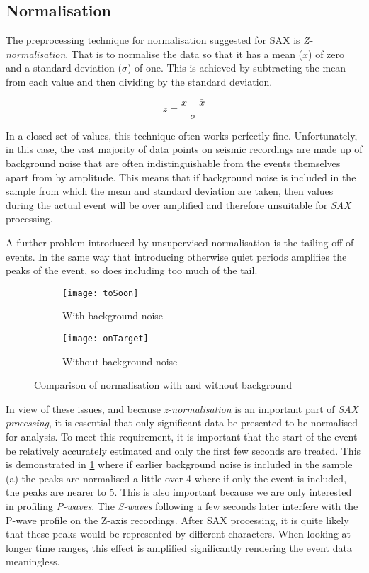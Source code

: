 \documentclass[../report.tex]{subfiles}
\begin{document}
	
\subsection{Normalisation} \label{sec:Z-normalisation}
	The preprocessing technique for normalisation suggested for SAX \citep{sax} is \textit{Z-normalisation}.  That is to normalise the data so that it has a mean ($\bar{x}$) of zero and a standard deviation ($\sigma$) of one.  This is achieved by subtracting the mean from each value and then dividing by the standard deviation.
	
	\begin{equation}
	z = \dfrac{x - \bar{x}}{\sigma}
	\end{equation}
	
	In a closed set of values, this technique often works perfectly fine.  Unfortunately, in this case, the vast majority of data points on seismic recordings are made up of background noise that are often indistinguishable from the events themselves apart from by amplitude.  This means that if background noise is included in the sample from which the mean and standard deviation are taken, then values during the actual event will be over amplified and therefore unsuitable for \textit{SAX} processing.
	
	A further problem introduced by unsupervised normalisation is the tailing off of events.  In the same way that introducing otherwise quiet periods amplifies the peaks of the event, so does including too much of the tail.
	
\begin{figure}[H]
	\begin{subfigure}{\textwidth}
		\centering
		\texttt{[image: toSoon]}
		\caption[]{With background noise}
	\end{subfigure}
	\begin{subfigure}{\textwidth}
		\centering
		\texttt{[image: onTarget]}
		\caption[]{Without background noise}
	\end{subfigure}
	\caption{Comparison of normalisation with and without background}
	\label{fig:tosoon}
\end{figure}

	In view of these issues, and because \textit{z-normalisation} is an important part of \textit{SAX processing}, it is essential that only significant data be presented to be normalised for analysis.  To meet this requirement, it is important that the start of the event be relatively accurately estimated and only the first few seconds are treated.  This is demonstrated in \cref{fig:tosoon} where if earlier background noise is included in the sample (a) the peaks are normalised a little over 4 where if only the event is included, the peaks are nearer to 5.  This is also important because we are only interested in profiling \textit{P-waves}. The \textit{S-waves} following a few seconds later interfere with the P-wave profile on the Z-axis recordings.  After SAX processing, it is quite likely that these peaks would be represented by different characters.  When looking at longer time ranges, this effect is amplified significantly rendering the event data meaningless.
\end{document}
